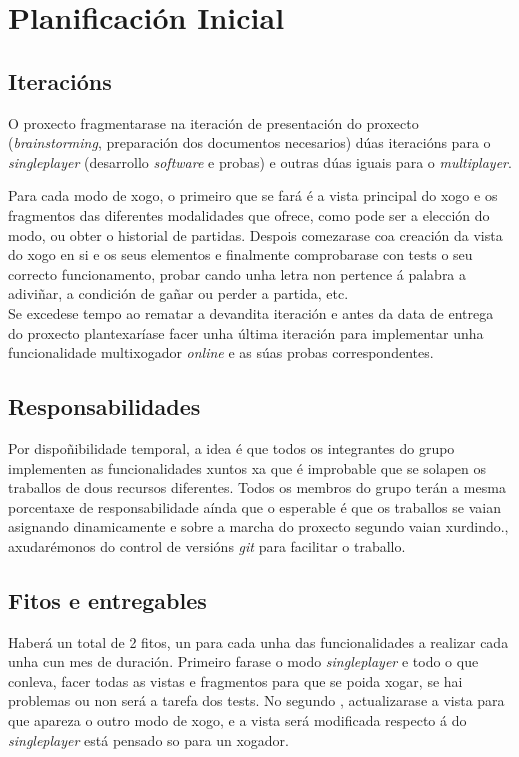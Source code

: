 \chapter{Planificación Inicial}
\label{chap:plan_inicial}

\section{Iteracións}
O proxecto fragmentarase na iteración de presentación do proxecto (\textit{brainstorming}, preparación dos documentos necesarios) dúas iteracións para o \textit{singleplayer} (desarrollo \textit{software} e probas) e outras dúas iguais para o \textit{multiplayer}.

Para cada modo de xogo, o primeiro que se fará é a vista principal do xogo e os fragmentos das diferentes modalidades que ofrece, como pode ser a elección do modo, ou obter o historial de partidas. Despois
comezarase coa creación da vista do xogo en si e os seus elementos e finalmente comprobarase con tests o seu correcto funcionamento, probar cando unha letra non pertence á palabra
a adiviñar, a condición de gañar ou perder a partida, etc.\\
Se excedese tempo ao rematar a devandita iteración e antes da data de entrega do proxecto plantexaríase facer unha última iteración para implementar unha funcionalidade multixogador \textit{online} e as súas probas correspondentes.

\section{Responsabilidades}
Por dispoñibilidade temporal, a idea é que todos os integrantes do grupo implementen as funcionalidades xuntos xa que é improbable que se solapen os traballos de dous recursos diferentes. Todos os membros do grupo terán a mesma porcentaxe de responsabilidade aínda que o esperable é que os traballos se vaian asignando dinamicamente e sobre a marcha do proxecto segundo vaian xurdindo., axudarémonos do control de versións \textit{git} para facilitar o traballo.

\section{Fitos e entregables}
Haberá un total de 2
fitos, un para cada unha das funcionalidades a realizar cada unha cun mes de duración. Primeiro farase o modo \textit{singleplayer} e todo o que conleva, facer todas as vistas e fragmentos para que se poida xogar, se hai problemas ou non será a tarefa dos tests. No segundo , actualizarase a vista para que apareza o outro modo de xogo, e a vista será modificada respecto á do \textit{singleplayer} está pensado so para un xogador.%


